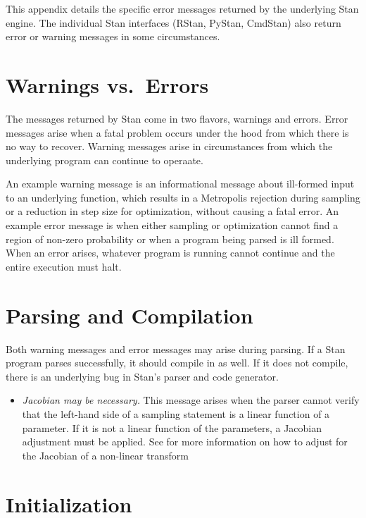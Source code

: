\noindent
This appendix details the specific error messages returned by the
underlying Stan engine.  The individual Stan interfaces (RStan,
PyStan, CmdStan) also return error or warning messages in some
circumstances.

\section{Warnings vs.\ Errors}

The messages returned by Stan come in two flavors, warnings and
errors.  Error messages arise when a fatal problem occurs under the
hood from which there is no way to recover.  Warning messages arise
in circumstances from which the underlying program can continue to
operaate.  

An example warning message is an informational message about
ill-formed input to an underlying function, which results in a
Metropolis rejection during sampling or a reduction in step size for
optimization, without causing a fatal error.  An example error message
is when either sampling or optimization cannot find a region of
non-zero probability or when a program being parsed is ill formed.
When an error arises, whatever program is running cannot continue and
the entire execution must halt.

\section{Parsing and Compilation}

Both warning messages and error messages may arise during parsing.  If
a Stan program parses successfully, it should compile in \Cpp as
well.  If it does not compile, there is an underlying bug in Stan's
parser and \Cpp code generator.

\begin{itemize}
\item {\it Jacobian may be necessary.}  This message arises when the
  parser cannot verify that the left-hand side of a sampling statement
  is a linear function of a parameter.  If it is not a linear function
  of the parameters, a Jacobian adjustment must be applied.  See
   for more information on how to
  adjust for the Jacobian of a non-linear transform
\end{itemize}


\section{Initialization}

